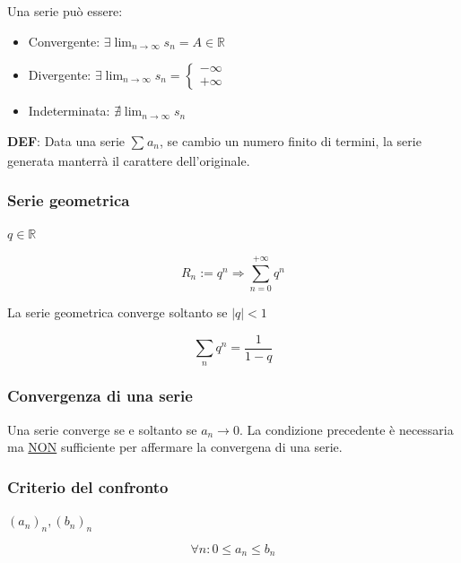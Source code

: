 \documentclass{article}
\begin{document}
\noindent
Una serie può essere:

\begin{itemize}
    \item Convergente: $\exists \lim_{n \to \infty} s_n = A \in \mathbb{R}$
    \item Divergente:
    $\exists \lim_{n \to \infty} s_n =
    \begin{cases}
            - \infty \\
            + \infty
    \end{cases}
    $
    \item Indeterminata: $\nexists  \lim_{n \to \infty} s_n$
\end{itemize}

\vspace{5mm}
\noindent
\textbf{DEF}: Data una serie $\sum_{}^{} a_n$, se cambio un
numero finito di termini, la serie generata manterrà
il carattere dell'originale.

\subsubsection{Serie geometrica}

$q \in \mathbb{R}$

\begin{equation}
    R_n := q^n \Rightarrow \sum_{n = 0}^{+\infty} q^n
\end{equation}

\vspace{5mm}
\noindent
La serie geometrica converge soltanto se $|q| < 1$

\begin{equation}
    \sum_{n}^{} q^n = \frac{1}{1 - q}
\end{equation}

\subsubsection{Convergenza di una serie}

Una serie converge se e soltanto se $a_n \to 0$.
La condizione precedente è necessaria ma \underline{NON} sufficiente
per affermare la convergena di una serie.

\subsubsection{Criterio del confronto}

$(a_n)_n, (b_n)_n$

\begin{equation}
    \forall n : 0 \leq a_n \leq b_n
\end{equation}
\end{document}
